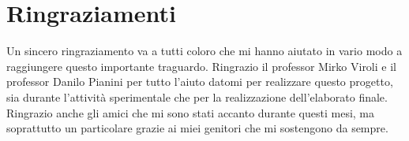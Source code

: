
\chapter*{Ringraziamenti}
Un sincero ringraziamento va a tutti coloro che mi hanno aiutato in vario modo a raggiungere questo importante traguardo.
Ringrazio il professor Mirko Viroli e il professor Danilo Pianini per tutto l’aiuto datomi per realizzare questo progetto, sia durante l'attività sperimentale che per la realizzazione dell'elaborato finale.
Ringrazio anche gli amici che mi sono stati accanto durante questi mesi, ma soprattutto un particolare grazie ai miei genitori che mi sostengono da sempre.
